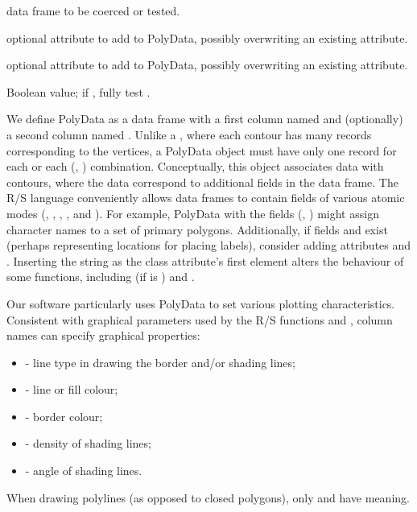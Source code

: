\documentclass[letterpaper]{book}
\begin{document}
%
\begin{Arguments}
\begin{ldescription}
\item[\code{x}] data frame to be coerced or tested.
\item[\code{projection}] optional  attribute to add to
PolyData, possibly overwriting an existing attribute.
\item[\code{zone}] optional  attribute to add to PolyData,
possibly overwriting an existing attribute.
\item[\code{fullValidation}] Boolean value; if , fully test
.
\end{ldescription}
\end{Arguments}
%
\begin{Details}\relax
We define PolyData as a data frame with a first column named 
and (optionally) a second column named . Unlike a
, where each contour has many records corresponding
to the vertices, a PolyData object must have only one record for each
 or each (, ) combination. Conceptually,
this object associates data with contours, where the data correspond to
additional fields in the data frame. The R/S language conveniently
allows data frames to contain fields of various atomic modes
(, , ,
, and ). For example, PolyData with the
fields (, ) might assign character names to a set
of primary polygons. Additionally, if fields  and  exist
(perhaps representing locations for placing labels), consider adding
attributes  and . Inserting the string
 as the class attribute's first element alters the
behaviour of some functions, including  (if
 is ) and .

Our software particularly uses PolyData to set various plotting
characteristics. Consistent with graphical parameters used by the R/S
functions  and , column names
can specify graphical properties:
\begin{itemize}

\item {} - line type in drawing the border and/or shading
lines;
\item {} - line or fill colour;
\item {} - border colour;
\item {} - density of shading lines;
\item {} - angle of shading lines.

\end{itemize}

When drawing polylines (as opposed to closed polygons), only 
and  have meaning.
\end{Details}
\end{document}

